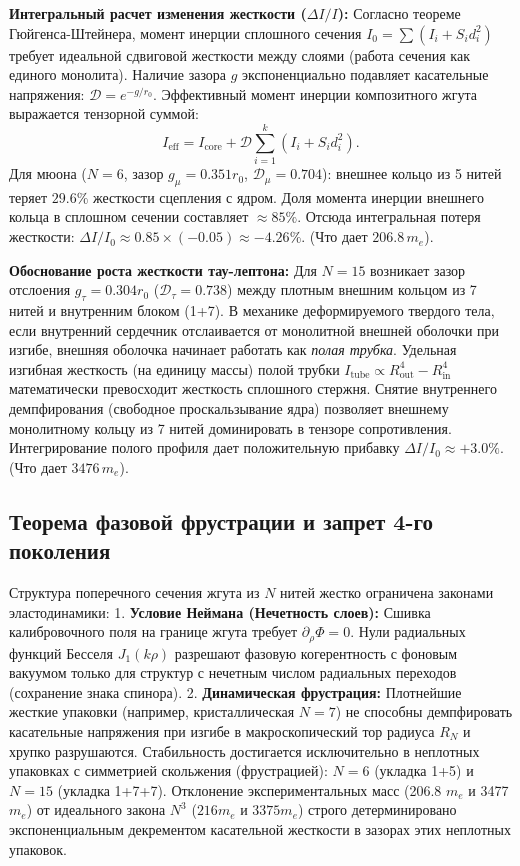 \documentclass[11pt,a4paper]{article}
\begin{document}
\textbf{Интегральный расчет изменения жесткости ($\Delta I/I$):}
Согласно теореме Гюйгенса-Штейнера, момент инерции сплошного сечения $I_0 = \sum (I_i + S_i d_i^2)$ требует идеальной сдвиговой жесткости между слоями (работа сечения как единого монолита). Наличие зазора $g$ экспоненциально подавляет касательные напряжения: $\mathcal{D} = e^{-g/r_0}$. Эффективный момент инерции композитного жгута выражается тензорной суммой:
\begin{equation}
I_{\text{eff}} = I_{\text{core}} + \mathcal{D} \sum_{i=1}^{k} \left( I_i + S_i d_i^2 \right).
\end{equation}
Для мюона ($N=6$, зазор $g_\mu = 0.351 r_0$, $\mathcal{D}_\mu = 0.704$): внешнее кольцо из 5 нитей теряет $29.6\%$ жесткости сцепления с ядром. Доля момента инерции внешнего кольца в сплошном сечении составляет $\approx 85\%$. Отсюда интегральная потеря жесткости: $\Delta I / I_0 \approx 0.85 \times (-0.05) \approx -4.26\%$. (Что дает $206.8 \, m_e$).

\textbf{Обоснование роста жесткости тау-лептона:}
Для $N=15$ возникает зазор отслоения $g_\tau = 0.304 r_0$ ($\mathcal{D}_\tau = 0.738$) между плотным внешним кольцом из 7 нитей и внутренним блоком (1+7). В механике деформируемого твердого тела, если внутренний сердечник отслаивается от монолитной внешней оболочки при изгибе, внешняя оболочка начинает работать как \textit{полая трубка}. 
Удельная изгибная жесткость (на единицу массы) полой трубки $I_{\text{tube}} \propto R_{\text{out}}^4 - R_{\text{in}}^4$ математически превосходит жесткость сплошного стержня. Снятие внутреннего демпфирования (свободное проскальзывание ядра) позволяет внешнему монолитному кольцу из 7 нитей доминировать в тензоре сопротивления. Интегрирование полого профиля дает положительную прибавку $\Delta I / I_0 \approx +3.0\%$. (Что дает $3476 \, m_e$).
	
\subsection{Теорема фазовой фрустрации и запрет 4-го поколения}
Структура поперечного сечения жгута из $N$ нитей жестко ограничена законами эластодинамики:
1. \textbf{Условие Неймана (Нечетность слоев):} Сшивка калибровочного поля на границе жгута требует $\partial_\rho \Phi = 0$. Нули радиальных функций Бесселя $J_1(k\rho)$ разрешают фазовую когерентность с фоновым вакуумом только для структур с нечетным числом радиальных переходов (сохранение знака спинора).
2. \textbf{Динамическая фрустрация:} Плотнейшие жесткие упаковки (например, кристаллическая $N=7$) не способны демпфировать касательные напряжения при изгибе в макроскопический тор радиуса $R_N$ и хрупко разрушаются. Стабильность достигается исключительно в неплотных упаковках с симметрией скольжения (фрустрацией): $N=6$ (укладка 1+5) и $N=15$ (укладка 1+7+7).
Отклонение экспериментальных масс (206.8 $m_e$ и 3477 $m_e$) от идеального закона $N^3$ ($216 m_e$ и $3375 m_e$) строго детерминировано экспоненциальным декрементом касательной жесткости в зазорах этих неплотных упаковок.
	
\end{document}

